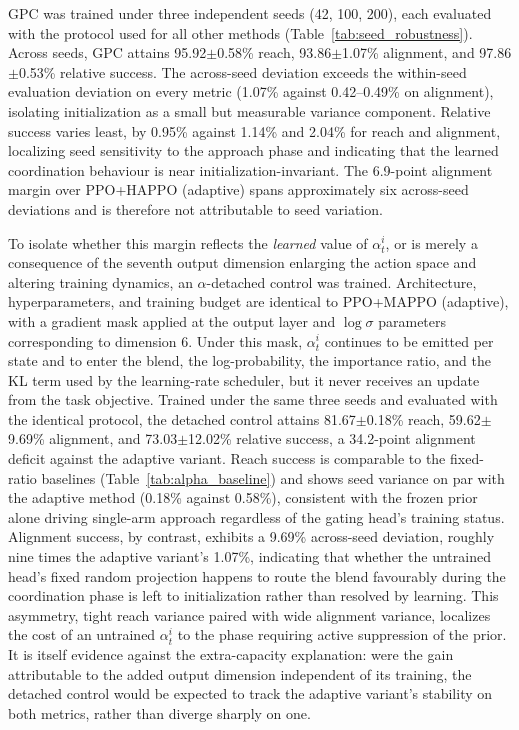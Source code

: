 GPC was trained under three independent seeds (42, 100, 200), each evaluated with the protocol used for
all other methods (Table~\ref{tab:seed_robustness}). Across seeds, GPC attains 95.92$\pm$0.58\% reach,
93.86$\pm$1.07\% alignment, and 97.86$\pm$0.53\% relative success. The across-seed deviation exceeds
the within-seed evaluation deviation on every metric (1.07\% against 0.42--0.49\% on alignment),
isolating initialization as a small but measurable variance component. Relative success varies least,
by 0.95\% against 1.14\% and 2.04\% for reach and alignment, localizing seed sensitivity to the
approach phase and indicating that the learned coordination behaviour is near
initialization-invariant. The 6.9-point alignment margin over PPO+HAPPO (adaptive) spans
approximately six across-seed deviations and is therefore not attributable to seed variation.

To isolate whether this margin reflects the \emph{learned} value of $\alpha_t^i$, or is merely a
consequence of the seventh output dimension enlarging the action space and altering training
dynamics, an $\alpha$-detached control was trained. Architecture, hyperparameters, and training
budget are identical to PPO+MAPPO (adaptive), with a gradient mask applied at the output layer and
$\log\sigma$ parameters corresponding to dimension 6. Under this mask, $\alpha_t^i$ continues to be
emitted per state and to enter the blend, the log-probability, the importance ratio, and the KL term
used by the learning-rate scheduler, but it never receives an update from the task objective. Trained
under the same three seeds and evaluated with the identical protocol, the detached control attains
81.67$\pm$0.18\% reach, 59.62$\pm$9.69\% alignment, and 73.03$\pm$12.02\% relative success, a
34.2-point alignment deficit against the adaptive variant. Reach success is comparable to the
fixed-ratio baselines (Table~\ref{tab:alpha_baseline}) and shows seed variance on par with the
adaptive method (0.18\% against 0.58\%), consistent with the frozen prior alone driving single-arm
approach regardless of the gating head's training status. Alignment success, by contrast, exhibits a
9.69\% across-seed deviation, roughly nine times the adaptive variant's 1.07\%, indicating that
whether the untrained head's fixed random projection happens to route the blend favourably during the
coordination phase is left to initialization rather than resolved by learning. This asymmetry, tight
reach variance paired with wide alignment variance, localizes the cost of an untrained $\alpha_t^i$
to the phase requiring active suppression of the prior. It is itself evidence against the
extra-capacity explanation: were the gain attributable to the added output dimension independent of
its training, the detached control would be expected to track the adaptive variant's stability on
both metrics, rather than diverge sharply on one.

